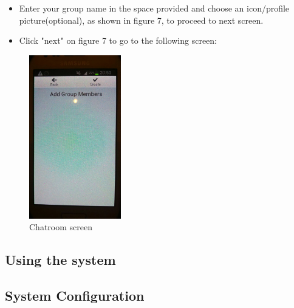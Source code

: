 \documentclass[a4paper]{article}
\begin{document}
\begin{itemize}
\item Enter your group name in the space provided and choose an icon/profile picture(optional), as shown in figure 7, to proceed to next screen. 
\end{itemize}

\begin{itemize}
\item Click "next" on figure 7 to go to the following screen:
\end{itemize}

\begin{figure}[h]
\centering
\includegraphics[scale=0.30, width=40mm]{./pictures/s3.jpg}
\caption{\label{fig:Agile}Chatroom screen}
\end{figure}




\newpage
\subsection{Using the system}

\subsection{System Configuration}
\end{document}
